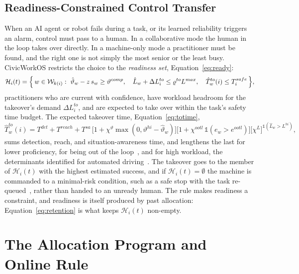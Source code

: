 \documentclass[utf8]{FrontiersinHarvard}
\begin{document}
	\subsection{Readiness-Constrained Control Transfer}
	\label{sec:takeover}

	When an AI agent or robot fails during a task, or its learned reliability triggers an alarm, control must pass to a human. In a collaborative mode the human in the loop takes over directly. In a machine-only mode a practitioner must be found, and the right one is not simply the most senior or the least busy. CivicWorkOS restricts the choice to the \textit{readiness set}, Equation~\eqref{eq:ready}:
	\begin{equation}
		\mathcal{H}_i(t) = \Bigl\{\, w\in\mathcal{W}_{k(i)} :\ \hat\vartheta_w - z\,s_w \ge \vartheta^{comp},\quad
		\hat L_w + \Delta L^{to}_i \le \varrho^{to} L^{max},\quad
		\hat T^{to}_w(i) \le T^{safe}_i \,\Bigr\},
		\label{eq:ready}
	\end{equation}
	practitioners who are current with confidence, have workload headroom for the takeover's demand $\Delta L^{to}_i$, and are expected to take over within the task's safety time budget. The expected takeover time, Equation~\eqref{eq:totime},
	\begin{equation}
		\hat T^{to}_w(i) = T^{det} + T^{reach} + T^{sa}\,\bigl[1+\chi^{\vartheta}\max(0,\vartheta^{hi}-\hat\vartheta_w)\bigr]\bigl[1+\chi^{ootl}\,\mathbb{1}(e_w>e^{ootl})\bigr]\bigl[\chi^{L}\bigr]^{\mathbb{1}(\hat L_w>L^{hi})},
		\label{eq:totime}
	\end{equation}
	sums detection, reach, and situation-awareness time, and lengthens the last for lower proficiency, for being out of the loop~\citep{EndsleyKiris1995,Gold2013}, and for high workload, the determinants identified for automated driving~\citep{Zhang2019}. The takeover goes to the member of $\mathcal{H}_i(t)$ with the highest estimated success, and if $\mathcal{H}_i(t)=\emptyset$ the machine is commanded to a minimal-risk condition, such as a safe stop with the task re-queued~\citep{SAEJ3016}, rather than handed to an unready human. The rule makes readiness a constraint, and readiness is itself produced by past allocation: Equation~\eqref{eq:retention} is what keeps $\mathcal{H}_i(t)$ non-empty.

	\section{The Allocation Program and Online Rule}
	\label{sec:allocation}
\end{document}
